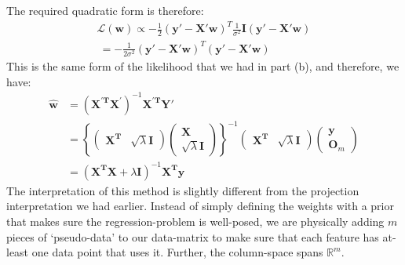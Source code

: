 \documentclass[submit]{harvardml}
\renewcommand{\v}{\boldsymbol}
\begin{document}
\begin{enumerate}[label=(\alph*)]
	The required quadratic form is therefore:
	\begin{align*}
		\mathcal{L}(\v{w}) \propto -\frac{1}{2} (\v{y'} - \v{X'w})^T \frac{1}{\sigma^2} \v{I} (\v{y'} - \v{X'w}) \\\
			= -\frac{1}{2\sigma^2}(\v{y'} - \v{X'w})^T(\v{y'} - \v{X'w}) 
	\end{align*}
	This is the same form of the likelihood that we had in part (b), and therefore, we have:
	\begin{align*}
		\v{\hat w} &= (\v{X^{'T}X^{'}})^{-1}\v{X^{'T}} \v{Y'} \\
				 &= \left\{\begin{pmatrix}
				 	\v{X^T} & \sqrt{\lambda} \v{I}
				 \end{pmatrix} \begin{pmatrix}
				 \v{X} \\ \sqrt{\lambda}\v{I}
				 \end{pmatrix}\right\}^{-1} \begin{pmatrix}
				 	\v{X^T} & \sqrt{\lambda} \v{I} 
				 \end{pmatrix} \begin{pmatrix}
	\v{y} \\ \v{O}_m
	\end{pmatrix} \\
	&= (\v{X^T X} + \lambda \v{I})^{-1} \v{X^T y}
	\end{align*}
	The interpretation of this method is slightly different from the projection interpretation we had earlier. Instead of simply defining the weights with a prior that makes sure the regression-problem is well-posed, we are physically adding $m$ pieces of `pseudo-data' to our data-matrix to make sure that each feature has at-least one data point that uses it. Further, the column-space spans $\mathbb{R}^m$.
						
\end{enumerate}
\end{document}
